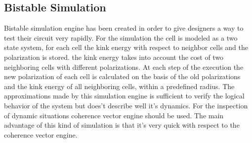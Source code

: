 \subsection{Bistable Simulation}
Bistable simulation engine has been created in order to give designers a way to test their circuit very rapidly. For the simulation the cell is modeled as a two state system, for each cell the kink energy with respect to neighbor cells and the polarization is stored. the kink energy takes into account the cost of two neighboring cells with different polarizations. At each step of the execution the new polarization of each cell is calculated on the basis of the old polarizations and the kink energy of all neighboring cells, within a predefined radius. The approximations made by this simulation engine is sufficient to verify the logical behavior of the system but does't describe well it's dynamics. For the inspection of dynamic situations coherence vector engine should be used. The main advantage of this kind of simulation is that it's very quick with respect to the coherence vector engine. 


